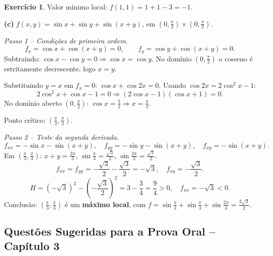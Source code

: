 \documentclass[12pt,a4paper]{article}
\theoremstyle{definition}
\newtheorem{exercise}{Exercício}[section]
\theoremstyle{remark}
\begin{document}
\begin{exercise}
  Valor mínimo local: $f(1,1)=1+1-3=-1$.

  \bigskip
  \textbf{(c)} $f(x,y)=\sin x+\sin y+\sin(x+y)$, em $(0,\tfrac{\pi}{2})\times(0,\tfrac{\pi}{2})$.

  \emph{Passo 1 -- Condições de primeira ordem.}
  \[
    f_x = \cos x + \cos(x+y) = 0,\qquad
    f_y = \cos y + \cos(x+y) = 0.
  \]
  Subtraindo: $\cos x - \cos y = 0 \Rightarrow \cos x = \cos y$.
  No domínio $(0,\tfrac{\pi}{2})$ o cosseno é estritamente decrescente, logo
  $x=y$.

  Substituindo $y=x$ em $f_x=0$:
  $\cos x + \cos 2x = 0$.
  Usando $\cos 2x = 2\cos^2 x - 1$:
  \[
    2\cos^2 x + \cos x - 1 = 0 \Rightarrow (2\cos x - 1)(\cos x + 1) = 0.
  \]
  No domínio aberto $(0,\tfrac{\pi}{2})$: $\cos x = \tfrac{1}{2}
  \Rightarrow x=\tfrac{\pi}{3}$.

  Ponto crítico: $\left(\tfrac{\pi}{3},\tfrac{\pi}{3}\right)$.

  \emph{Passo 2 -- Teste da segunda derivada.}
  \[
    f_{xx}=-\sin x-\sin(x+y),\quad
    f_{yy}=-\sin y-\sin(x+y),\quad
    f_{xy}=-\sin(x+y).
  \]
  Em $\left(\tfrac{\pi}{3},\tfrac{\pi}{3}\right)$: $x+y=\tfrac{2\pi}{3}$,
  $\sin\tfrac{\pi}{3}=\tfrac{\sqrt{3}}{2}$, $\sin\tfrac{2\pi}{3}=\tfrac{\sqrt{3}}{2}$.
  \[
    f_{xx}=f_{yy}=-\frac{\sqrt{3}}{2}-\frac{\sqrt{3}}{2}=-\sqrt{3},\quad
    f_{xy}=-\frac{\sqrt{3}}{2}.
  \]
  \[
    H = (-\sqrt{3})^2-\left(-\frac{\sqrt{3}}{2}\right)^2 = 3-\frac{3}{4}=\frac{9}{4}>0,
    \quad f_{xx}=-\sqrt{3}<0.
  \]
  Conclusão: $\left(\tfrac{\pi}{3},\tfrac{\pi}{3}\right)$ é um \textbf{máximo local},
  com $f=\sin\tfrac{\pi}{3}+\sin\tfrac{\pi}{3}+\sin\tfrac{2\pi}{3}=\tfrac{3\sqrt{3}}{2}$.
\end{exercise}

\subsection{Questões Sugeridas para a Prova Oral -- Capítulo 3}
\end{document}
